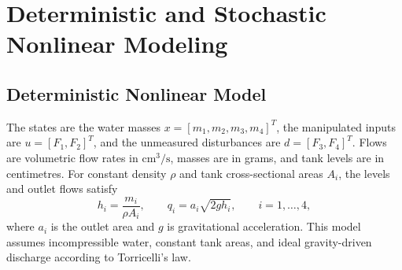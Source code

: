\chapter{Deterministic and Stochastic Nonlinear Modeling}
\label{chap:problem2}

\section{Deterministic Nonlinear Model}

The states are the water masses $x=[m_1,m_2,m_3,m_4]^T$, the
manipulated inputs are $u=[F_1,F_2]^T$, and the unmeasured disturbances
are $d=[F_3,F_4]^T$. Flows are volumetric flow rates in
$\mathrm{cm^3/s}$, masses are in grams, and tank levels are in centimetres.
For constant density $\rho$ and tank cross-sectional areas $A_i$,
the levels and outlet flows satisfy
\begin{equation}
 h_i=\frac{m_i}{\rho A_i},\qquad
 q_i=a_i\sqrt{2g h_i},\qquad i=1,\ldots,4,
 \label{eq:p2-torricelli}
\end{equation}
where $a_i$ is the outlet area and $g$ is gravitational acceleration.
This model assumes incompressible water, constant tank areas, and ideal
gravity-driven discharge according to Torricelli's law.

